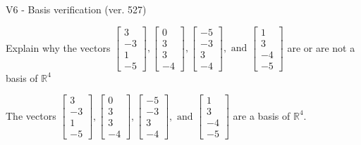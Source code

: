 \begin{exercise}
  \begin{exerciseTitle}V6 - Basis verification (ver. 527)\end{exerciseTitle}
  \begin{exerciseStatement}
    Explain why the vectors \(\left[\begin{array}{r}
3 \\
-3 \\
1 \\
-5
\end{array}\right] , \left[\begin{array}{r}
0 \\
3 \\
3 \\
-4
\end{array}\right] , \left[\begin{array}{r}
-5 \\
-3 \\
3 \\
-4
\end{array}\right] , \text{ and } \left[\begin{array}{r}
1 \\
3 \\
-4 \\
-5
\end{array}\right]\) are or are not a basis of \(\mathbb{R}^4\)	


  \end{exerciseStatement}
  \begin{exerciseAnswer}
   The vectors \(\left[\begin{array}{r}
3 \\
-3 \\
1 \\
-5
\end{array}\right] , \left[\begin{array}{r}
0 \\
3 \\
3 \\
-4
\end{array}\right] , \left[\begin{array}{r}
-5 \\
-3 \\
3 \\
-4
\end{array}\right] , \text{ and } \left[\begin{array}{r}
1 \\
3 \\
-4 \\
-5
\end{array}\right]\) 
  	 are  a basis of \(\mathbb{R}^4\).
  


  \end{exerciseAnswer}
\end{exercise}